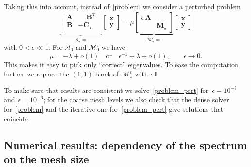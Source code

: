 \documentclass[12pt]{article}
\newcommand{\vect}[1]{\boldsymbol{\mathbf{#1}}}
\begin{document}
Taking this into account, instead of~\eqref{problem} we consider a perturbed\footnotemark{} problem
\begin{equation}\label{problem_pert}
	\underbrace{\begin{bmatrix}
		\vect A & \phantom{-}\vect B^T \\
		\vect B & -\vect C_\star \\
	\end{bmatrix}}_{\mathcal A_\star \coloneqq}
	\begin{bmatrix}
		\vect x \\
		\vect y
	\end{bmatrix}
	=
	\mu
	\underbrace{\begin{bmatrix}
		\epsilon\,\vect A & \\
		& \vect M_\star
	\end{bmatrix}}_{\mathcal M^\epsilon_\star \coloneqq}
	\begin{bmatrix}
		\vect x \\
		\vect y
	\end{bmatrix}
\end{equation}
with $0 < \epsilon \ll 1$. For $\mathcal A_0$ and $\mathcal M^\epsilon_0$ we have
\begin{equation}
	\mu = -\lambda + o(1)\quad\text{or}\quad\epsilon^{-1} + \lambda + o(1),\qquad\epsilon \rightarrow 0.
\end{equation}
This makes it easy to pick only ``correct'' eigenvalues. To ease the computation further we replace the $(1, 1)$-block of~$\mathcal M^\epsilon_\star$ with $\epsilon\,\vect I$. 

To make sure that results are consistent we solve~\eqref{problem_pert} for~$\epsilon = 10^{-5}$ and~$\epsilon = 10^{-6}$; for the coarse mesh levels we also check that the dense solver for~\eqref{problem} and the iterative one for~\eqref{problem_pert} give solutions that coincide.  


\subsection{Numerical results: dependency of the spectrum on the mesh size}
\end{document}
